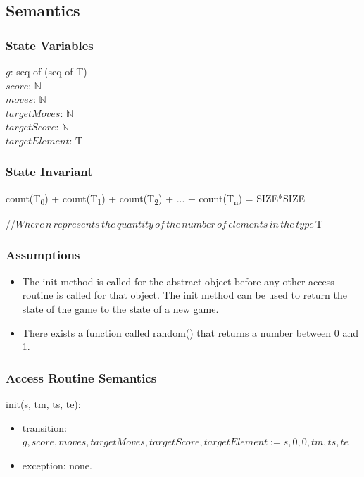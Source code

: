 \documentclass[12pt]{article}
\begin{document}
\subsection* {Semantics}

\subsubsection* {State Variables}

$g$: seq of (seq of T)\\
$score$: $\mathbb{N}$\\
$moves$: $\mathbb{N}$\\
$targetMoves$: $\mathbb{N}$\\
$targetScore$: $\mathbb{N}$\\
$targetElement$: T\\

\subsubsection* {State Invariant}

count(T\textsubscript{0}) + count(T\textsubscript{1}) + count(T\textsubscript{2}) + ... + count(T\textsubscript{n}) = SIZE*SIZE

\noindent//$Where\, n\, represents\, the\, quantity\, of\, the\, number\, of\, elements\, in\, the\, type\, \mbox{T}$

\subsubsection* {Assumptions}

\begin{itemize}

\item The init method is called for the abstract object before any other access routine is called for that object. The init method can be used to return the state of the game to the state of a new game.

\item There exists a function called random() that returns a number between 0 and 1.
\end{itemize}
\subsubsection*{Access Routine Semantics}

init(s, tm, ts, te):

\begin{itemize}

\item transition: $g, score, moves, targetMoves, targetScore, targetElement := s, 0, 0, tm, ts, te$

\item exception: none.

\end{itemize}
\end{document}
